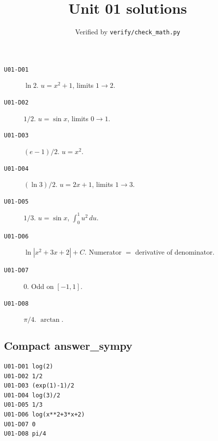 
\title{Unit 01 solutions}
\author{Verified by \texttt{verify/check\_math.py}}
\date{}

\maketitle

\begin{description}
\item[\texttt{U01-D01}] \(\ln 2\). \(u=x^2+1\), limits \(1\to2\).
\item[\texttt{U01-D02}] \(1/2\). \(u=\sin x\), limits \(0\to1\).
\item[\texttt{U01-D03}] \((e-1)/2\). \(u=x^2\).
\item[\texttt{U01-D04}] \((\ln 3)/2\). \(u=2x+1\), limits \(1\to3\).
\item[\texttt{U01-D05}] \(1/3\). \(u=\sin x\), \(\int_0^1 u^2\,du\).
\item[\texttt{U01-D06}] \(\ln|x^2+3x+2|+C\). Numerator \(=\) derivative of denominator.
\item[\texttt{U01-D07}] \(0\). Odd on \([-1,1]\).
\item[\texttt{U01-D08}] \(\pi/4\). \(\arctan\).
\end{description}

\subsection*{Compact answer\_sympy}
\begin{verbatim}
U01-D01 log(2)
U01-D02 1/2
U01-D03 (exp(1)-1)/2
U01-D04 log(3)/2
U01-D05 1/3
U01-D06 log(x**2+3*x+2)
U01-D07 0
U01-D08 pi/4
\end{verbatim}

